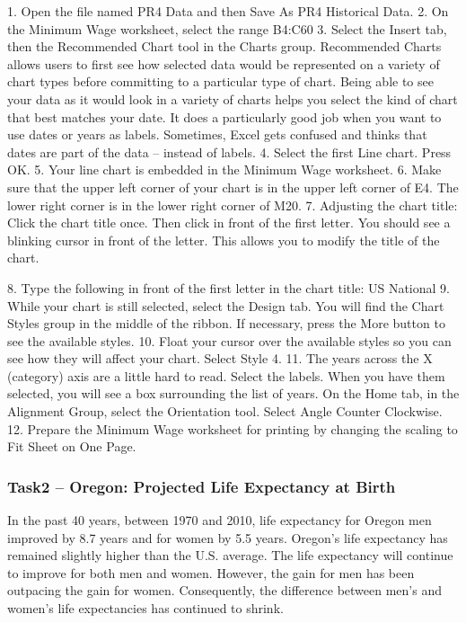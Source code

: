 1. Open the file named PR4 Data and then Save As PR4 Historical Data.
2. On the Minimum Wage worksheet, select the range B4:C60
3. Select the Insert tab, then the Recommended Chart tool in the Charts group.
Recommended Charts allows users to first see how selected data would be represented on a
variety of chart types before committing to a particular type of chart. Being able to see your data
as it would look in a variety of charts helps you select the kind of chart that best matches your
date.
It does a particularly good job when you want to use dates or years as labels. Sometimes, Excel
gets confused and thinks that dates are part of the data – instead of labels.
4. Select the first Line chart. Press OK.
5. Your line chart is embedded in the Minimum Wage worksheet.
6. Make sure that the upper left corner of your chart is in the upper left corner of E4. The lower
right corner is in the lower right corner of M20.
7. Adjusting the chart title: Click the chart title once. Then click in front of the first letter. You
should see a blinking cursor in front of the letter. This allows you to modify the title of the chart.

8. Type the following in front of the first letter in the chart title: US National
9. While your chart is still selected, select the Design tab. You will find the Chart Styles group in
the middle of the ribbon. If necessary, press the More button to see the available styles.
10. Float your cursor over the available styles so you can see how they will affect your chart. Select
Style 4.
11. The years across the X (category) axis are a little hard to read.
Select the labels. When you have them selected, you will see a box surrounding the list of years.
On the Home tab, in the Alignment Group, select the Orientation tool. Select Angle Counter
Clockwise.
12. Prepare the Minimum Wage worksheet for printing by changing the scaling to Fit Sheet on
One Page.

\subsubsection{Task2 – Oregon: Projected Life Expectancy at Birth}

In the past 40 years, between 1970 and 2010, life expectancy for Oregon men improved by 8.7 years
and for women by 5.5 years. Oregon’s life expectancy has remained slightly higher than the U.S.
average. The life expectancy will continue to improve for both men and women. However, the gain
for men has been outpacing the gain for women. Consequently, the difference between men’s and
women’s life expectancies has continued to shrink.

